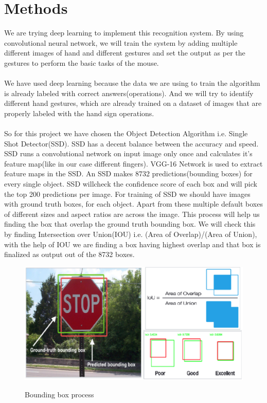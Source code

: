 \documentclass[12pt]{article}
\begin{document}
\section{Methods}
We are trying deep learning to implement this recognition system. By using  convolutional neural network, we will train the system by adding multiple different images of hand and different gestures and set the output as per the gestures to perform the basic tasks of the mouse.\\
\\
We have used deep learning because the data we are using to train the algorithm is already labeled with correct answers(operations). And we will try to identify different hand gestures, which are already trained on a dataset of images that are properly labeled with the hand sign operations.\\
\\
So for this project we have chosen the Object Detection Algorithm i.e. Single Shot Detector(SSD). SSD has a decent balance between the accuracy and speed. SSD runs a convolutional network on input image only once and calculates it's feature map(like in our case different fingers). VGG-16 Network is used to extract feature maps in the SSD. An SSD makes 8732 predictions(bounding boxes) for every single object. SSD willcheck the confidence score of each box and will pick the top 200 predictions per image. For training of SSD we should have images with ground truth boxes, for each object. Apart from these multiple default boxes of different sizes and aspect ratios are across the image. This process will help us finding the box that overlap the ground truth bounding box. We will check this by finding Intersection over Union(IOU) i.e. (Area of Overlap)/(Area of Union), with the help of IOU we are finding a box having highest overlap and that box is finalized as output out of the 8732 boxes. \\
\begin{figure}[h]
\centering
\includegraphics[scale=0.5]{GTB_IOU.PNG}
\caption{Bounding box process}
\label{GTB_IOU.PNG}
\cite{5}
\end{figure}
\end{document}
